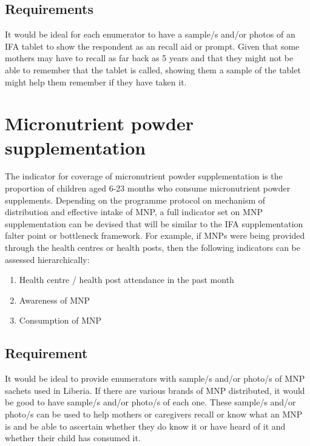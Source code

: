 \documentclass[12pt,a4paper]{book}
\theoremstyle{definition}
\theoremstyle{definition}
\theoremstyle{definition}
\theoremstyle{remark}
\begin{document}
\hypertarget{requirements-2}{%
\subsection{Requirements}\label{requirements-2}}

It would be ideal for each enumerator to have a sample/s and/or photos
of an IFA tablet to show the respondent as an recall aid or prompt.
Given that some mothers may have to recall as far back as 5 years and
that they might not be able to remember that the tablet is called,
showing them a sample of the tablet might help them remember if they
have taken it.

\hypertarget{micronutrient-powder-supplementation}{%
\section{Micronutrient powder
supplementation}\label{micronutrient-powder-supplementation}}

The indicator for coverage of micronutrient powder supplementation is
the proportion of children aged 6-23 months who consume micronutrient
powder supplements. Depending on the programme protocol on mechanism of
distribution and effective intake of MNP, a full indicator set on MNP
supplementation can be devised that will be similar to the IFA
supplementation falter point or bottleneck framework. For example, if
MNPs were being provided through the health centres or health posts,
then the following indicators can be assessed hierarchically:

\begin{enumerate}
\def\labelenumi{\arabic{enumi}.}
\item
  Health centre / health post attendance in the past month
\item
  Awareness of MNP
\item
  Consumption of MNP
\end{enumerate}

\hypertarget{requirement}{%
\subsection{Requirement}\label{requirement}}

It would be ideal to provide enumerators with sample/s and/or photo/s of
MNP sachets used in Liberia. If there are various brands of MNP
distributed, it would be good to have sample/s and/or photo/s of each
one. These sample/s and/or photo/s can be used to help mothers or
caregivers recall or know what an MNP is and be able to ascertain
whether they do know it or have heard of it and whether their child has
consumed it.
\end{document}
